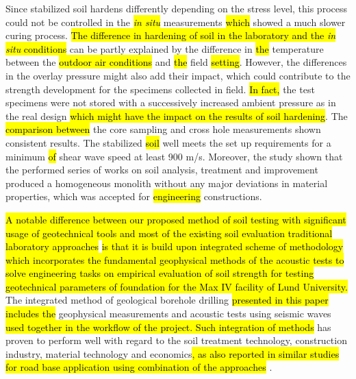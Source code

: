 \documentclass[USenglish,twocolumn]{article}
\begin{document}
Since stabilized soil hardens differently depending on the stress level, this process could not be controlled in the \emph{\hl{in situ}} measurements \hl{which} showed a much slower curing process. \hl{ The difference in hardening of soil in the laboratory and the \emph{in situ} conditions} can be partly explained by the difference in \hl{the }temperature between the \hl{outdoor air conditions }and \hl{the} field \hl{setting}. However, the differences in the overlay pressure might also add their impact, which could contribute to the strength development for the specimens collected in field. \hl{In fact, }the test specimens were not stored with a successively increased ambient pressure as in the real design \hl{which might have the impact on the results of soil hardening}. The \hl{comparison between }the core sampling and cross hole measurements shown consistent results. The stabilized \hl{soil} well meets the set up requirements for a minimum \hl{of }shear wave speed at least 900 m/s. Moreover, the study shown that the performed series of works on soil analysis, treatment and improvement produced a homogeneous monolith without any major deviations in material properties, which was accepted for \hl{engineering} constructions. 

\hl{A notable difference between our proposed method of soil testing with significant usage of geotechnical tools and most of the existing soil evaluation traditional laboratory approaches} \cite{Barwar,Sharma,Lindh202302} \hl{is that it is build upon integrated scheme of methodology which incorporates the fundamental geophysical methods of the acoustic tests to solve engineering tasks on empirical evaluation of soil strength for testing geotechnical parameters of foundation for the Max IV facility of Lund University.} The integrated method of geological borehole drilling \hl{presented in this paper includes the} geophysical measurements and acoustic tests using seismic waves \hl{used together in the workflow of the project. Such integration of methods }has proven to perform well with regard to the soil treatment technology, construction industry, material technology and economics\hl{, as also reported in similar studies for road base application using combination of the approaches} \cite{Gupta,Lindh202234,Eberemu,Lindh202303}. 
\end{document}

